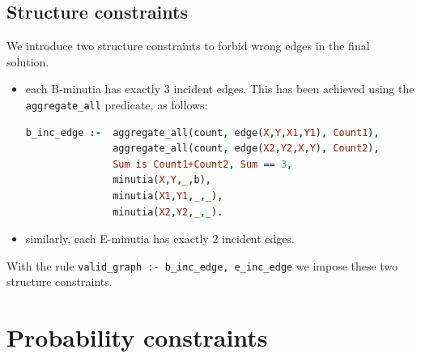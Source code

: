 \documentclass[8pt]{article}
\begin{document}
\subsection{Structure constraints}
We introduce two structure constraints to forbid wrong edges
in the final solution.
\begin{itemize}
  \item
    each B-minutia has exactly $3$ incident edges. This has been achieved
    using the \texttt{aggregate\_all} predicate, as follows:
      \begin{lstlisting}[language=Prolog,frame = single,basicstyle=\footnotesize\ttfamily]
b_inc_edge :-  aggregate_all(count, edge(X,Y,X1,Y1), Count1),
               aggregate_all(count, edge(X2,Y2,X,Y), Count2),
               Sum is Count1+Count2, Sum == 3,
               minutia(X,Y,_,b),
               minutia(X1,Y1,_,_),
               minutia(X2,Y2,_,_).
      \end{lstlisting}
  \item
    similarly, each E-minutia has exactly $2$ incident edges.
\end{itemize}
With the rule \texttt{valid\_graph :- b\_inc\_edge, e\_inc\_edge} we impose
these two structure constraints.

\section{Probability constraints}
\end{document}
